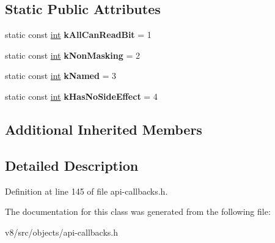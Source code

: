 \subsection*{Static Public Attributes}
\begin{DoxyCompactItemize}
\item 
\mbox{\label{classv8_1_1internal_1_1InterceptorInfo_aa4a7b2457a216259d917c96c14a1932b}} 
static const \mbox{\hyperlink{classint}{int}} {\bfseries k\+All\+Can\+Read\+Bit} = 1
\item 
\mbox{\label{classv8_1_1internal_1_1InterceptorInfo_ab3bb54f40178db5bb9c609b68d885ba8}} 
static const \mbox{\hyperlink{classint}{int}} {\bfseries k\+Non\+Masking} = 2
\item 
\mbox{\label{classv8_1_1internal_1_1InterceptorInfo_a27cee69c3c44ba4e48b2e2c13dc63d9d}} 
static const \mbox{\hyperlink{classint}{int}} {\bfseries k\+Named} = 3
\item 
\mbox{\label{classv8_1_1internal_1_1InterceptorInfo_a8ed5152d378a07b8a3447378ff7900fc}} 
static const \mbox{\hyperlink{classint}{int}} {\bfseries k\+Has\+No\+Side\+Effect} = 4
\end{DoxyCompactItemize}
\subsection*{Additional Inherited Members}


\subsection{Detailed Description}


Definition at line 145 of file api-\/callbacks.\+h.



The documentation for this class was generated from the following file\+:\begin{DoxyCompactItemize}
\item 
v8/src/objects/api-\/callbacks.\+h\end{DoxyCompactItemize}

